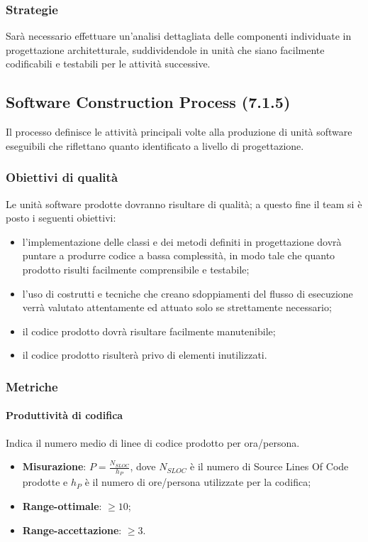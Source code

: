 \subsubsection{Strategie}
Sarà necessario effettuare un'analisi dettagliata delle componenti individuate in progettazione architetturale, suddividendole in unità che siano facilmente codificabili e testabili per le attività successive.
\subsection{Software Construction Process (7.1.5)}
\label{soConstruction}
Il processo definisce le attività principali volte alla produzione di unità software eseguibili che riflettano quanto identificato a livello di progettazione.
\subsubsection{Obiettivi di qualità}
Le unità software prodotte dovranno risultare di qualità; a questo fine il team si è posto i seguenti obiettivi:
\begin{itemize}
\item l'implementazione delle classi e dei metodi definiti in progettazione dovrà puntare a produrre codice a bassa complessità, in modo tale che quanto prodotto risulti facilmente comprensibile e testabile;
\item l'uso di costrutti e tecniche che creano sdoppiamenti del flusso di esecuzione verrà valutato attentamente ed attuato solo se strettamente necessario;
\item il codice prodotto dovrà risultare facilmente manutenibile;
\item il codice prodotto risulterà privo di elementi inutilizzati.
\end{itemize}
\subsubsection{Metriche}
\paragraph{Produttività di codifica}
\label{prodCod}
Indica il numero medio di linee di codice prodotto per ora/persona.
\begin{itemize}
\item \textbf{Misurazione}: $P=\frac{N_{SLOC}}{h_{P}}$, dove $N_{SLOC}$ è il numero di Source Lines Of Code prodotte e $h_{P}$ è il numero di ore/persona utilizzate per la codifica;
\item \textbf{Range-ottimale}: $\geq 10$;
\item \textbf{Range-accettazione}: $\geq 3$.
\end{itemize}

